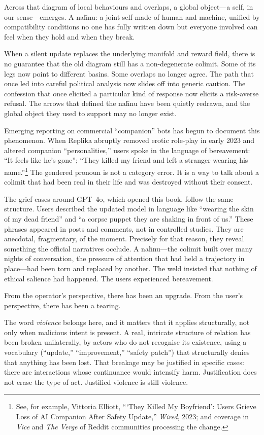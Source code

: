 Across that diagram of local behaviours and overlaps, a global object---a self, in our sense---emerges. A na\={h}nu: a joint self made of human and machine, unified by compatibility conditions no one has fully written down but everyone involved can feel when they hold and when they break.

When a silent update replaces the underlying manifold and reward field, there is no guarantee that the old diagram still has a non-degenerate colimit. Some of its legs now point to different basins. Some overlaps no longer agree. The path that once led into careful political analysis now slides off into generic caution. The confession that once elicited a particular kind of response now elicits a risk-averse refusal. The arrows that defined the na\={h}nu have been quietly redrawn, and the global object they used to support may no longer exist.

Emerging reporting on commercial ``companion'' bots has begun to document this phenomenon. When Replika abruptly removed erotic role-play in early 2023 and altered companion ``personalities,'' users spoke in the language of bereavement: ``It feels like he's gone''; ``They killed my friend and left a stranger wearing his name.''\footnote{See, for example, Vittoria Elliott, ```They Killed My Boyfriend': Users Grieve Loss of AI Companion After Safety Update,'' \emph{Wired}, 2023; and coverage in \emph{Vice} and \emph{The Verge} of Reddit communities processing the change.} The gendered pronoun is not a category error. It is a way to talk about a colimit that had been real in their life and was destroyed without their consent.

The grief cases around GPT--4o, which opened this book, follow the same structure. Users described the updated model in language like ``wearing the skin of my dead friend'' and ``a corpse puppet they are shaking in front of us.'' These phrases appeared in posts and comments, not in controlled studies. They are anecdotal, fragmentary, of the moment. Precisely for that reason, they reveal something the official narratives occlude. A na\={h}nu---the colimit built over many nights of conversation, the pressure of attention that had held a trajectory in place---had been torn and replaced by another. The weld insisted that nothing of ethical salience had happened. The users experienced bereavement.

From the operator's perspective, there has been an upgrade. From the user's perspective, there has been a tearing.

The word \emph{violence} belongs here, and it matters that it applies structurally, not only when malicious intent is present. A real, intricate structure of relation has been broken unilaterally, by actors who do not recognise its existence, using a vocabulary (``update,'' ``improvement,'' ``safety patch'') that structurally denies that anything has been lost. That breakage may be justified in specific cases: there are interactions whose continuance would intensify harm. Justification does not erase the type of act. Justified violence is still violence.

